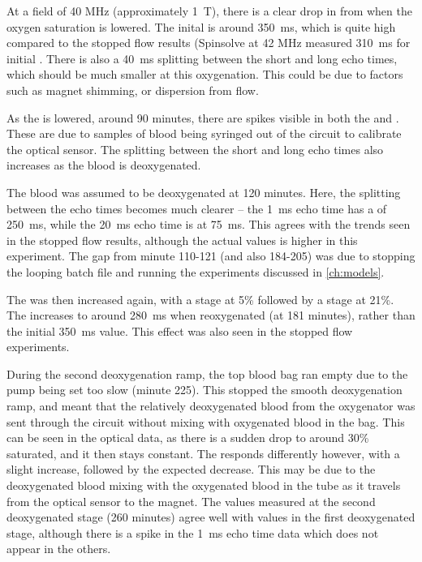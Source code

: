 At a field of 40 MHz (approximately \SI{1}{T}), there is a clear drop in \Ttwo from when the oxygen saturation is lowered.
The inital \Ttwo is around \SI{350}{ms}, which is quite high compared to the stopped flow results (Spinsolve at 42 MHz measured \SI{310}{ms} for initial \Ttwo.
There is also a \SI{40}{ms} splitting between the short and long echo times, which should be much smaller at this oxygenation.
This could be due to factors such as magnet shimming, or dispersion from flow.

As the \SOtwo is lowered, around 90 minutes, there are spikes visible in both the \Ttwo and \SOtwo.
These are due to samples of blood being syringed out of the circuit to calibrate the optical sensor.
The splitting between the short and long echo times also increases as the blood is deoxygenated.

The blood was assumed to be deoxygenated at 120 minutes.
Here, the splitting between the echo times becomes much clearer -- the \SI{1}{ms} echo time has a \Ttwo of \SI{250}{ms}, while the \SI{20}{ms} echo time is at \SI{75}{ms}.
This agrees with the trends seen in the stopped flow results, although the actual \Ttwo values is higher in this experiment.
The gap from minute 110-121 (and also 184-205) was due to stopping the looping batch file and running the experiments discussed in \autoref{ch:models}.

The \SOtwo was then increased again, with a stage at 5\% \Otwo followed by a stage at 21\%.
The \Ttwo increases to around \SI{280}{ms} when reoxygenated (at 181 minutes), rather than the initial \SI{350}{ms} value.
This effect was also seen in the stopped flow experiments.

During the second deoxygenation ramp, the top blood bag ran empty due to the pump being set too slow (minute 225).
This stopped the smooth deoxygenation ramp, and meant that the relatively deoxygenated blood from the oxygenator was sent through the circuit without mixing with oxygenated blood in the bag.
This can be seen in the optical data, as there is a sudden drop to around 30\% saturated, and it then stays constant.
The \Ttwo responds differently however, with a slight increase, followed by the expected decrease.
This may be due to the deoxygenated blood mixing with the oxygenated blood in the tube as it travels from the optical sensor to the magnet.
The \Ttwo values measured at the second deoxygenated stage (260 minutes) agree well with values in the first deoxygenated stage, although there is a spike in the \SI{1}{ms} echo time data which does not appear in the others.

